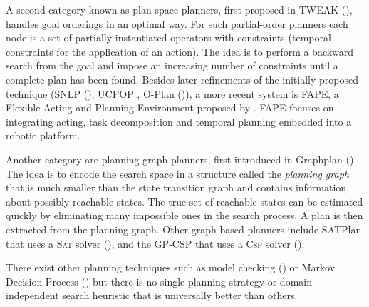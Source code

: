A second category known as plan-space planners, first proposed in TWEAK (\cite{chapman1987planning}), handles goal orderings in an optimal way. 
For such partial-order planners each node is a set of partially instantiated-operators with constraints (\eg temporal constraints for the application of an action).
The idea is to perform a backward search from the goal and impose an increasing number of constraints until a complete plan has been found.
Besides later refinements of the initially proposed technique (SNLP (\cite{mcallester1991systematic}), UCPOP \cite{penberthy1992ucpop}, O-Plan (\cite{tate1994plan2})), a more recent system is FAPE, a Flexible Acting and Planning Environment proposed by \cite{dvorak2014flexible}.
FAPE focuses on integrating acting, task decomposition and temporal planning embedded into a robotic platform.

Another category are planning-graph planners, first introduced in Graphplan (\cite{blum:97}).
The idea is to encode the search space in a structure called the \textit{planning graph} that is much smaller than the state transition graph and contains information about possibly reachable states.
The true set of reachable states can be estimated quickly by eliminating many impossible ones in the search process.
A plan is then extracted from the planning graph.
Other graph-based planners include SATPlan that uses a \textsc{Sat} solver  (\cite{kautz:06,kautz:99,rintanen2014madagascar}), and the GP-CSP that uses a \textsc{Csp} solver (\cite{do:01,lopez2003generalizing,cooper2011weighted}).

There exist other planning techniques such as model checking (\cite{triantafillou2015unifying}) or Markov Decision Process (\cite{kolobov2012planning}) but there is no single planning strategy or domain-independent search heuristic that is universally better than others.


